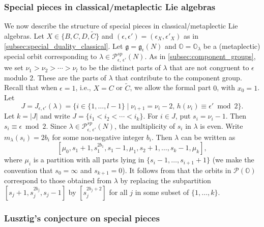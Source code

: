 \documentclass[11pt, a4paper]{amsart}
\newcommand{\g}{\mathfrak{g}}
\newcommand{\orb}{\mathbb{O}}
\newcommand{\cP}{\mathcal{P}}
\newcommand{\mC}{\widetilde{C}}
\newcommand{\Pee}{\cP^{sp}_{\epsilon,\,\epsilon'}}
\theoremstyle{definition}
\numberwithin{equation}{section}
\begin{document}
\subsubsection{Special pieces in classical/metaplectic Lie algebras} \label{subsec:special_piece_classical}
We now describe the structure of special pieces in classical/metaplectic Lie algebras. Let $X \in \{B, C, D, \mC\}$ and $(\epsilon, \epsilon') = (\epsilon_X,\epsilon'_X)$ as in \cref{subsec:special_duality_classical}.
Let $\g = \g_\epsilon(N)$ and $\orb = \orb_\lambda$ be a (metaplectic) special orbit corresponding to $\lambda \in \Pee(N)$. As in \cref{subsec:component_groups}, we set $\nu_1>\nu_2>\cdots>\nu_l$ to be the distinct parts of $\lambda$ that are not congruent to $\epsilon$ modulo $2$.
These are the parts of $\lambda$ that contribute to the
component group. Recall that when $\epsilon = 1$, i.e., $X = C$ or $\mC$, we allow the formal part \(0\), with \(x_0 = 1\).
Let 
\begin{equation}\label{eq:J}
	J = J_{\epsilon,\epsilon'}(\lambda) = 
\{ i \in \{ 1, \ldots, l - 1 \} \mid \nu_{i+1} = \nu_i - 2,\, h(\nu_i) \equiv \epsilon' \bmod 2 \}.
\end{equation}
Let $k = \lvert J\rvert$ and write $J = \{ i_1 < i_2 < \cdots < i_k\}$. For $i \in J$, put $s_i = \nu_i - 1$.
Then $s_i \equiv \epsilon \bmod 2$. Since $\lambda \in \Pee(N)$, the multiplicity of $s_i$ in $\lambda$ is even. Write $m_\lambda(s_i) = 2b_i$ for some non-negative integer $b_i$.
Then $\lambda$ can be written as 
\[[\mu_0, s_1+1, s_1^{2b_1}, s_1-1, \mu_1, s_2+1, \ldots, s_k-1, \mu_k],\]
where $\mu_i$ is a partition with all parts lying in $\{s_i - 1, \ldots, s_{i+1} + 1\}$ (we make the convention that $s_0 = \infty$ and $s_{k+1} = 0$).
It follows from \cite[Section 2.4]{JLS:Duality} that the orbits in $\cP(\orb)$ correspond to those obtained from $\lambda$ by replacing the subpartition $[s_j+1,s_j^{2b_j},s_j-1]$ by $[s_j^{2b_j+2}]$ for all $j$ in some subset of $\{ 1,\ldots, k\}$.






\subsubsection{Lusztig's conjecture on special pieces} \label{subsec:Lusztig}
\end{document}
